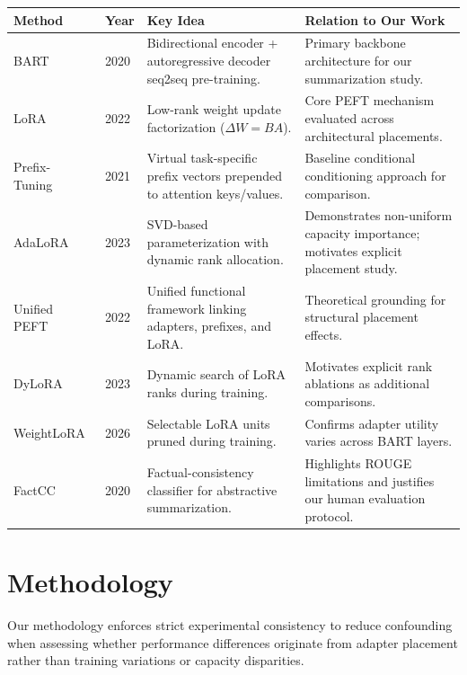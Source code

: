 \documentclass[11pt, letterpaper]{article}
\begin{document}
\begin{center}
\small
\begin{tabular}{@{}llp{4.7cm}p{4.7cm}@{}}
\toprule
\textbf{Method} & \textbf{Year} & \textbf{Key Idea} & \textbf{Relation to Our Work} \\
\midrule
BART~\cite{lewis2020bart} & 2020 & Bidirectional encoder + autoregressive decoder seq2seq pre-training. & Primary backbone architecture for our summarization study. \\
LoRA~\cite{hu2022lora} & 2022 & Low-rank weight update factorization ($\Delta W = BA$). & Core PEFT mechanism evaluated across architectural placements. \\
Prefix-Tuning~\cite{li2021prefix} & 2021 & Virtual task-specific prefix vectors prepended to attention keys/values. & Baseline conditional conditioning approach for comparison. \\
AdaLoRA~\cite{zhang2023adalora} & 2023 & SVD-based parameterization with dynamic rank allocation. & Demonstrates non-uniform capacity importance; motivates explicit placement study. \\
Unified PEFT~\cite{he2022unified} & 2022 & Unified functional framework linking adapters, prefixes, and LoRA. & Theoretical grounding for structural placement effects. \\
DyLoRA~\cite{valipour2023dylora} & 2023 & Dynamic search of LoRA ranks during training. & Motivates explicit rank ablations as additional comparisons. \\
WeightLoRA~\cite{veprikov2026weightlora} & 2026 & Selectable LoRA units pruned during training. & Confirms adapter utility varies across BART layers. \\
FactCC~\cite{kryscinski2020evaluating} & 2020 & Factual-consistency classifier for abstractive summarization. & Highlights ROUGE limitations and justifies our human evaluation protocol. \\
\bottomrule
\end{tabular}
\end{center}

\section{Methodology}
Our methodology enforces strict experimental consistency to reduce confounding when assessing whether performance differences originate from adapter placement rather than training variations or capacity disparities.
\end{document}
